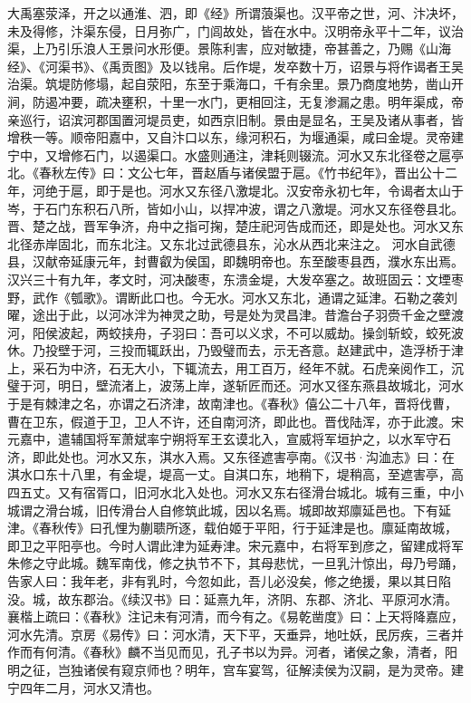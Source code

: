 \documentclass[12pt,UTF8]{ctexbook}
\begin{document}
大禹塞荥泽，开之以通淮、泗，即《经》所谓蒗渠也。汉平帝之世，河、汴决坏，未及得修，汴渠东侵，日月弥广，门闾故处，皆在水中。汉明帝永平十二年，议治渠，上乃引乐浪人王景问水形便。景陈利害，应对敏捷，帝甚善之，乃赐《山海经》、《河渠书》、《禹贡图》及以钱帛。后作堤，发卒数十万，诏景与将作谒者王吴治渠。筑堤防修塌，起自荥阳，东至于乘海口，千有余里。景乃商度地势，凿山开涧，防遏冲要，疏决壅积，十里一水门，更相回注，无复渗漏之患。明年渠成，帝亲巡行，诏滨河郡国置河堤员吏，如西京旧制。景由是显名，王吴及诸从事者，皆增秩一等。顺帝阳嘉中，又自汴口以东，缘河积石，为堰通渠，咸曰金堤。灵帝建宁中，又增修石门，以遏渠口。水盛则通注，津耗则辍流。河水又东北径卷之扈亭北。《春秋左传》曰：文公七年，晋赵盾与诸侯盟于扈。《竹书纪年》，晋出公十二年，河绝于扈，即于是也。河水又东径八激堤北。汉安帝永初七年，令谒者太山于岑，于石门东积石八所，皆如小山，以捍冲波，谓之八激堤。河水又东径卷县北。晋、楚之战，晋军争济，舟中之指可掬，楚庄祀河告成而还，即是处也。河水又东北径赤岸固北，而东北注。又东北过武德县东，沁水从西北来注之。
河水自武德县，汉献帝延康元年，封曹叡为侯国，即魏明帝也。东至酸枣县西，濮水东出焉。汉兴三十有九年，孝文时，河决酸枣，东溃金堤，大发卒塞之。故班固云：文堙枣野，武作《瓠歌》。谓断此口也。今无水。河水又东北，通谓之延津。石勒之袭刘曜，途出于此，以河冰泮为神灵之助，号是处为灵昌津。昔澹台子羽赍千金之壁渡河，阳侯波起，两蛟挟舟，子羽曰：吾可以义求，不可以威劫。操剑斩蛟，蛟死波休。乃投壁于河，三投而辄跃出，乃毁璧而去，示无吝意。赵建武中，造浮桥于津上，采石为中济，石无大小，下辄流去，用工百万，经年不就。石虎亲阅作工，沉璧于河，明日，壁流渚上，波荡上岸，遂斩匠而还。河水又径东燕县故城北，河水于是有棘津之名，亦谓之石济津，故南津也。《春秋》僖公二十八年，晋将伐曹，曹在卫东，假道于卫，卫人不许，还自南河济，即此也。晋伐陆浑，亦于此渡。宋元嘉中，遣辅国将军萧斌率宁朔将军王玄谟北入，宣威将军垣护之，以水军守石济，即此处也。河水又东，淇水入焉。又东径遮害亭南。《汉书·沟洫志》曰：在淇水口东十八里，有金堤，堤高一丈。自淇口东，地稍下，堤稍高，至遮害亭，高四五丈。又有宿胥口，旧河水北入处也。河水又东右径滑台城北。城有三重，中小城谓之滑台城，旧传滑台人自修筑此城，因以名焉。城即故郑廪延邑也。下有延津。《春秋传》曰孔悝为蒯聩所逐，载伯姬于平阳，行于延津是也。廪延南故城，即卫之平阳亭也。今时人谓此津为延寿津。宋元嘉中，右将军到彦之，留建成将军朱修之守此城。魏军南伐，修之执节不下，其母悲忧，一旦乳汁惊出，母乃号踊，告家人曰：我年老，非有乳时，今忽如此，吾儿必没矣，修之绝援，果以其日陷没。城，故东郡治。《续汉书》曰：延熹九年，济阴、东郡、济北、平原河水清。襄楷上疏曰：《春秋》注记未有河清，而今有之。《易乾凿度》曰：上天将降嘉应，河水先清。京房《易传》曰：河水清，天下平，天垂异，地吐妖，民厉疾，三者并作而有何清。《春秋》麟不当见而见，孔子书以为异。河者，诸侯之象，清者，阳明之征，岂独诸侯有窥京师也？明年，宫车宴驾，征解渎侯为汉嗣，是为灵帝。建宁四年二月，河水又清也。
\end{document}

